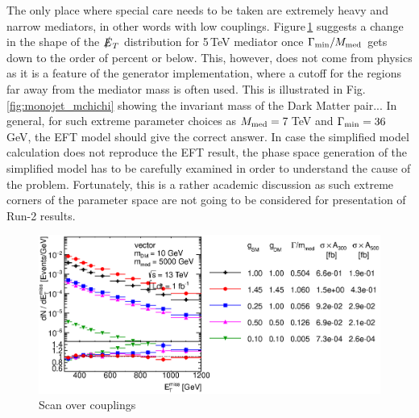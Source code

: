 The only place where special care needs to be taken are extremely heavy and narrow mediators, in other words with low couplings. Figure\,\ref{fig:monojet_narrow} suggests a change in the shape of the $\slashed{E}_T$ distribution for 5\,TeV mediator once $\Gamma_{\rm{min}}/M_{\rm{med}}$ gets down to the order of percent or below.
This, however, does not come from physics as it is a feature of the generator implementation, where a cutoff for the regions far away from the mediator mass is often used. This is illustrated in Fig.\,\ref{fig:monojet_mchichi} showing the invariant mass of the Dark Matter pair...
In general, for such extreme parameter choices as $M_{\rm{med}}=7$\,TeV and $\Gamma_{\rm{min}}=36$\,GeV, the EFT model should give the correct answer. In case the simplified model calculation does not reproduce the EFT result, the phase space generation of the simplified model has to be carefully examined in order to understand the cause of the problem. Fortunately, this is a rather academic discussion as such extreme corners of the parameter space are not going to be considered for presentation of Run-2 results.

%
%

\begin{figure}
\centering
\includegraphics[width=0.9\linewidth]{figures/monojet/scan_g_V_10_5000.eps}
\caption{Scan over couplings}
\label{fig:monojet_narrow}
\end{figure}


